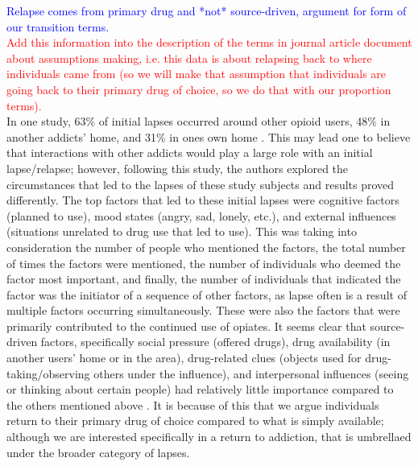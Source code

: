 \documentclass[12pt]{article}
\begin{document}
\textcolor{blue}{Relapse comes from primary drug and *not* source-driven, argument for form of our transition terms.} \\
\textcolor{red}{Add this information into the description of the terms in journal article document about assumptions making, i.e. this data is about relapsing back to where individuals came from (so we will make that assumption that individuals are going back to their primary drug of choice, so we do that with our proportion terms).} \\
In one study, 63\% of initial lapses occurred around other opioid users, 48\% in another addicts' home, and 31\% in ones own home \cite{Gossop1}. This may lead one to believe that interactions with other addicts would play a large role with an initial lapse/relapse; however, following this study, the authors explored the circumstances that led to the lapses of these study subjects and results proved differently. The top factors that led to these initial lapses were cognitive factors (planned to use), mood states (angry, sad, lonely, etc.), and external influences (situations unrelated to drug use that led to use). This was taking into consideration the number of people who mentioned the factors, the total number of times the factors were mentioned, the number of individuals who deemed the factor most important, and finally, the number of individuals that indicated the factor was the initiator of a sequence of other factors, as lapse often is a result of multiple factors occurring simultaneously. These were also the factors that were primarily contributed to the continued use of opiates. It seems clear that source-driven factors, specifically social pressure (offered drugs), drug availability (in another users' home or in the area), drug-related clues (objects used for drug-taking/observing others under the influence), and interpersonal influences (seeing or thinking about certain people) had relatively little importance compared to the others mentioned above \cite{Gossop2}. It is because of this that we argue individuals return to their primary drug of choice compared to what is simply available; although we are interested specifically in a return to addiction, that is umbrellaed under the broader category of lapses. \\
\end{document}
